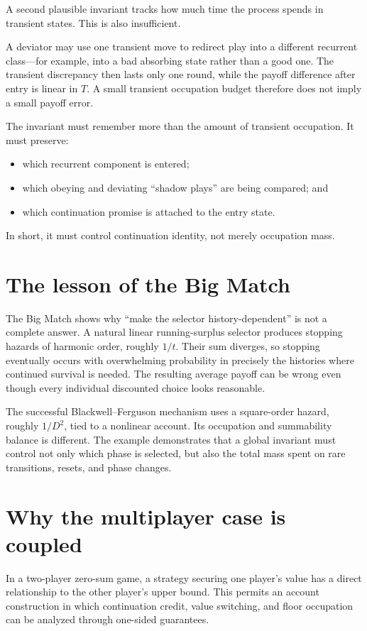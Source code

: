 \documentclass[11pt]{article}
\begin{document}
A second plausible invariant tracks how much time the process spends in
transient states.  This is also insufficient.

A deviator may use one transient move to redirect play into a different
recurrent class---for example, into a bad absorbing state rather than a good
one.  The transient discrepancy then lasts only one round, while the payoff
difference after entry is linear in \(T\).  A small transient occupation
budget therefore does not imply a small payoff error.

The invariant must remember more than the amount of transient occupation.  It
must preserve:
\begin{itemize}
  \item which recurrent component is entered;
  \item which obeying and deviating ``shadow plays'' are being compared; and
  \item which continuation promise is attached to the entry state.
\end{itemize}
In short, it must control continuation identity, not merely occupation mass.

\section{The lesson of the Big Match}

The Big Match shows why ``make the selector history-dependent'' is not a
complete answer.  A natural linear running-surplus selector produces stopping
hazards of harmonic order, roughly \(1/t\).  Their sum diverges, so stopping
eventually occurs with overwhelming probability in precisely the histories
where continued survival is needed.  The resulting average payoff can be
wrong even though every individual discounted choice looks reasonable.

The successful Blackwell--Ferguson mechanism uses a square-order hazard,
roughly \(1/D^2\), tied to a nonlinear account.  Its occupation and
summability balance is different.  The example demonstrates that a global
invariant must control not only which phase is selected, but also the total
mass spent on rare transitions, resets, and phase changes.

\section{Why the multiplayer case is coupled}

In a two-player zero-sum game, a strategy securing one player's value has a
direct relationship to the other player's upper bound.  This permits an
account construction in which continuation credit, value switching, and
floor occupation can be analyzed through one-sided guarantees.
\end{document}
